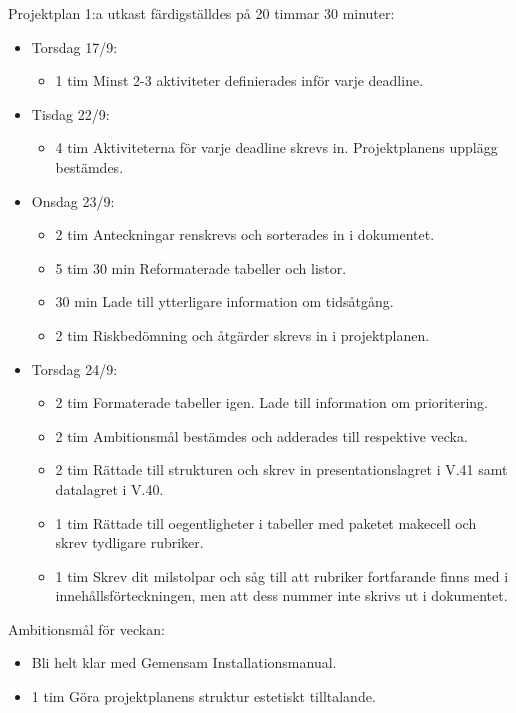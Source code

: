 \documentclass{TDP003mall}
\begin{document}
	Projektplan 1:a utkast färdigställdes på 20 timmar 30 minuter:
\begin{itemize}
	\item Torsdag 17/9:
	\begin{itemize}
		\item 1 tim Minst 2-3 aktiviteter definierades inför varje deadline.
	\end{itemize}
	\item Tisdag 22/9:
	\begin{itemize}
		\item 4 tim Aktiviteterna för varje deadline skrevs in. Projektplanens upplägg bestämdes.
	\end{itemize}
	\item Onsdag 23/9:
	\begin{itemize}
		\item 2 tim Anteckningar renskrevs och sorterades in i dokumentet.
		\item 5 tim 30 min Reformaterade tabeller och listor.
		\item 30 min Lade till ytterligare information om tidsåtgång.
                \item 2 tim Riskbedömning och åtgärder skrevs in i projektplanen.
	\end{itemize}
        \item Torsdag 24/9:
        \begin{itemize}
		\item 2 tim Formaterade tabeller igen. Lade till information om prioritering.
        \item 2 tim Ambitionsmål bestämdes och adderades till respektive vecka.
        \item 2 tim Rättade till strukturen och skrev in presentationslagret i V.41 samt datalagret i V.40.
        \item 1 tim Rättade till oegentligheter i tabeller med paketet makecell och skrev tydligare rubriker.
        \item 1 tim Skrev dit milstolpar och såg till att rubriker fortfarande finns med i innehållsförteckningen, men att dess nummer inte skrivs ut i dokumentet.
	\end{itemize}
      \end{itemize}

Ambitionsmål för veckan:
\begin{itemize}
\item Bli helt klar med Gemensam Installationsmanual.
  \item 1 tim Göra projektplanens struktur estetiskt tilltalande.
  \end{itemize}
\end{document}

